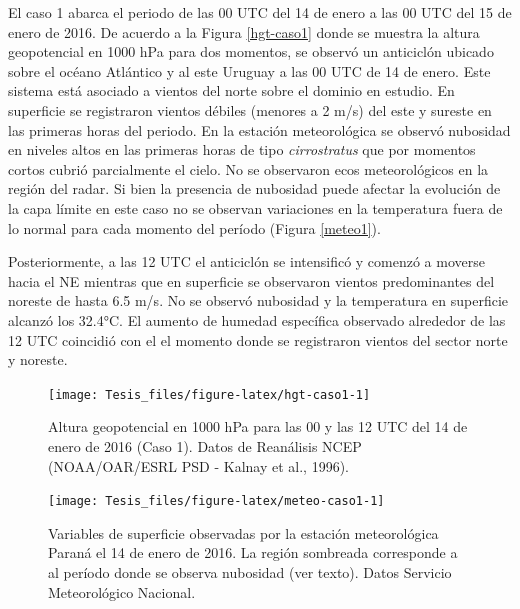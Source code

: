 \documentclass[12pt,spanish,oneside]{book}
\begin{document}
El caso 1 abarca el periodo de las 00 UTC del 14 de enero a las 00 UTC
del 15 de enero de 2016. De acuerdo a la Figura \ref{hgt-caso1} donde se
muestra la altura geopotencial en 1000 hPa para dos momentos, se observó
un anticiclón ubicado sobre el océano Atlántico y al este Uruguay a las
00 UTC de 14 de enero. Este sistema está asociado a vientos del norte
sobre el dominio en estudio. En superficie se registraron vientos
débiles (menores a 2 m/s) del este y sureste en las primeras horas del
periodo. En la estación meteorológica se observó nubosidad en niveles
altos en las primeras horas de tipo \emph{cirrostratus} que por momentos
cortos cubrió parcialmente el cielo. No se observaron ecos
meteorológicos en la región del radar. Si bien la presencia de nubosidad
puede afectar la evolución de la capa límite en este caso no se observan
variaciones en la temperatura fuera de lo normal para cada momento del
período (Figura \ref{meteo1}).

Posteriormente, a las 12 UTC el anticiclón se intensificó y comenzó a
moverse hacia el NE mientras que en superficie se observaron vientos
predominantes del noreste de hasta 6.5 m/s. No se observó nubosidad y la
temperatura en superficie alcanzó los 32.4°C. El aumento de humedad
específica observado alrededor de las 12 UTC coincidió con el el momento
donde se registraron vientos del sector norte y noreste.

\begin{figure}

{\centering \texttt{[image: Tesis\_files/figure-latex/hgt-caso1-1]} 

}

\caption{Altura geopotencial en 1000 hPa para las 00 y las 12 UTC del 14 de enero de 2016 (Caso 1). Datos de Reanálisis NCEP (NOAA/OAR/ESRL PSD - Kalnay et al., 1996). \label{hgt-caso1}}\label{fig:hgt-caso1}
\end{figure}

\begin{figure}

{\centering \texttt{[image: Tesis\_files/figure-latex/meteo-caso1-1]} 

}

\caption{Variables de superficie observadas por la estación meteorológica Paraná el 14 de enero de 2016. La región sombreada corresponde a al período donde se observa nubosidad (ver texto). Datos Servicio Meteorológico Nacional. \label{meteo1}}\label{fig:meteo-caso1}
\end{figure}
\end{document}
